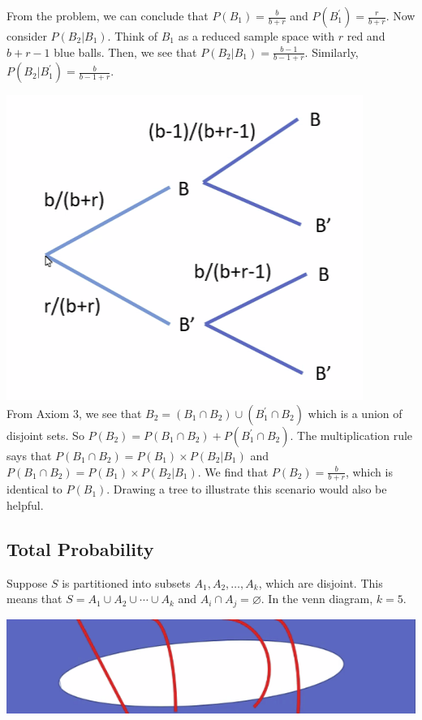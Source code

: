 From the problem, we can conclude that $P(B_{1}) = \frac{b}{b+r}$ and $P(B^\mathsf{'}_{1}) = \frac{r}{b+r}$. Now consider $P(B_{2}|B_{1})$. Think of $B_{1}$ as a reduced sample space with $r$ red and $b+r-1$ blue balls. Then, we see that $P(B_{2}|B_{1}) = \frac{b-1}{b-1+r}$. Similarly, $P(B_{2}|B^\mathsf{'}_1) = \frac{b}{b-1+r}$.

\vspace{0in}\includegraphics[scale=1]{media/wk1tree.png} \\

From Axiom 3, we see that $B_{2} = (B_{1} \cap B_{2}) \cup (B^\mathsf{'}_1 \cap B_{2})$ which is a union of disjoint sets. So $P(B_{2}) = P(B_{1} \cap B_{2}) + P(B^\mathsf{'}_1 \cap B_{2})$. The multiplication rule says that $P(B_{1} \cap B_{2}) = P(B_{1}) \times P(B_{2} | B_{1})$ and $P(B_{1} \cap B_{2}) = P(B_{1}) \times P(B_{2}|B_{1})$. We find that $P(B_{2}) = \frac{b}{b+r}$, which is identical to $P(B_{1})$. Drawing a tree to illustrate this scenario would also be helpful. 

\subsection{Total Probability}
Suppose $S$ is partitioned into subsets $A_{1}, A_{2}, \ldots, A_{k}$, which are disjoint. This means that $S = A_{1} \cup A_{2} \cup \cdots \cup A_{k}$ and $A_{i} \cap A_{j} = \varnothing$. In the venn diagram, $k=5$.

\vspace{0in}\includegraphics[scale=1]{media/wk1totalprobability.png} \\

